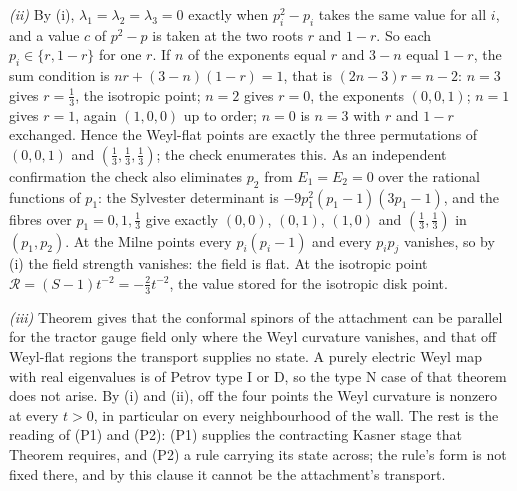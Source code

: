 \emph{(ii)} By (i), $\lambda_{1} = \lambda_{2} = \lambda_{3} = 0$ exactly when $p_{i}^{2} - p_{i}$ takes the same value for all $i$, and a value $c$ of $p^{2} - p$ is taken at the two roots $r$ and $1 - r$. So each $p_{i} \in \{r, 1 - r\}$ for one $r$. If $n$ of the exponents equal $r$ and $3 - n$ equal $1 - r$, the sum condition is $nr + (3 - n)(1 - r) = 1$, that is $(2n - 3)r = n - 2$: $n = 3$ gives $r = \tfrac13$, the isotropic point; $n = 2$ gives $r = 0$, the exponents $(0, 0, 1)$; $n = 1$ gives $r = 1$, again $(1, 0, 0)$ up to order; $n = 0$ is $n = 3$ with $r$ and $1 - r$ exchanged. Hence the Weyl-flat points are exactly the three permutations of $(0, 0, 1)$ and $(\tfrac13, \tfrac13, \tfrac13)$; the check enumerates this. As an independent confirmation the check also eliminates $p_{2}$ from $E_{1} = E_{2} = 0$ over the rational functions of $p_{1}$: the Sylvester determinant is $-9p_{1}^{2}(p_{1} - 1)(3p_{1} - 1)$, and the fibres over $p_{1} = 0, 1, \tfrac13$ give exactly $(0, 0)$, $(0, 1)$, $(1, 0)$ and $(\tfrac13, \tfrac13)$ in $(p_{1}, p_{2})$. At the Milne points every $p_{i}(p_{i} - 1)$ and every $p_{i}p_{j}$ vanishes, so by (i) the field strength vanishes: the field is flat. At the isotropic point $\mathcal{R} = (S - 1)t^{-2} = -\tfrac23 t^{-2}$, the value stored for the isotropic disk point.

\emph{(iii)} Theorem  gives that the conformal spinors of the attachment can be parallel for the tractor gauge field only where the Weyl curvature vanishes, and that off Weyl-flat regions the transport supplies no state. A purely electric Weyl map with real eigenvalues is of Petrov type I or D, so the type N case of that theorem does not arise. By (i) and (ii), off the four points the Weyl curvature is nonzero at every $t > 0$, in particular on every neighbourhood of the wall. The rest is the reading of (P1) and (P2): (P1) supplies the contracting Kasner stage that Theorem  requires, and (P2) a rule carrying its state across; the rule's form is not fixed there, and by this clause it cannot be the attachment's transport.

